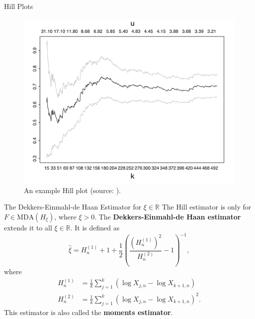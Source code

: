 \documentclass{beamer}
\newcommand{\MDA}{\text{MDA}}
\begin{document}
\begin{frame}{Hill Plots}
    \begin{figure}
        \centering
        \includegraphics[scale=0.35]{hill_plot.png}
        \caption{An example Hill plot (source: \cite{embrechts_et_al_1997}).}
        \label{fig:hill_plot}
    \end{figure}
\end{frame}

\begin{frame}{The Dekkers-Einmahl-de Haan Estimator for $\xi \in \mathbb{R}$}
    The Hill estimator is only for $F \in \MDA(H_{\xi})$, where $\xi > 0$. The \textbf{Dekkers-Einmahl-de Haan estimator} extends it to all $\xi \in \mathbb{R}$. It is defined as
    \[
    \hat{\xi} = H_n^{(1)} + 1 + \frac{1}{2}\left(\frac{(H_n^{(1)})^2}{H_n^{(2)}} - 1\right)^{-1},
    \]
    where
    \begin{align*}
        H_n^{(1)} &= \frac{1}{k}\sum_{j = 1}^k (\log X_{j, n} - \log X_{k + 1, n}) \\
        H_n^{(2)} &= \frac{1}{k}\sum_{j = 1}^k (\log X_{j, n} - \log X_{k + 1, n})^2.
    \end{align*}
    This estimator is also called the \textbf{moments estimator}. 
\end{frame}
\end{document}
